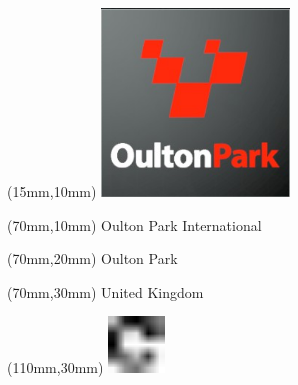 \null\newpage
\begin{textblock*}{50mm}(15mm,10mm)%
\includegraphics[width=50mm]{LG/2015-05-20_00091.png}
\end{textblock*}
\begin{textblock*}{130mm}(70mm,10mm)%
{\fontsize{20}{20}\selectfont Oulton Park International}\\
\end{textblock*}
\begin{textblock*}{120mm}(70mm,20mm)%
{\fontsize{16}{16}\selectfont Oulton Park}\\
\end{textblock*}
\begin{textblock*}{120mm}(70mm,30mm)%
{\fontsize{12}{12}\selectfont United Kingdom}
\end{textblock*}
\begin{textblock*}{30mm}(110mm,30mm)%
\centering
\includegraphics[height=15mm]{icons/fa-rotate-right.pdf}
\end{textblock*}
